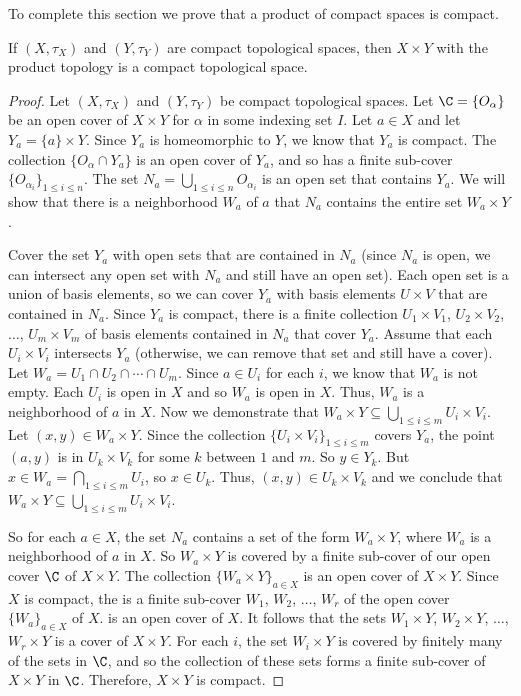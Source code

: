 To complete this section we prove that a product of compact spaces is compact.  

\begin{theorem} If $(X, \tau_X)$ and $(Y, \tau_Y)$ are compact topological spaces, then $X \times Y$ with the product topology is a compact topological space.  
\end{theorem}

\begin{proof} Let $(X, \tau_X)$ and $(Y, \tau_Y)$ be compact topological spaces. Let $\C = \{O_{\alpha}\}$ be an open cover of $X \times Y$ for $\alpha$ in some indexing set $I$. Let $a \in X$ and let $Y_a = \{a\} \times Y$. Since $Y_a$ is homeomorphic to $Y$, we know that $Y_a$ is compact. The collection $\{O_{\alpha} \cap Y_a\}$ is an open cover of $Y_a$, and so has a finite sub-cover $\{O_{\alpha_i}\}_{1 \leq i \leq n}$. The set $N_a = \bigcup_{1 \leq i \leq n} O_{\alpha_i}$ is an open set that contains $Y_a$. We will show that there is a neighborhood $W_a$ of $a$ that $N_a$ contains the entire set $W_a \times Y$. 

Cover the set $Y_a$ with open sets that are contained in $N_a$ (since $N_a$ is open, we can intersect any open set with $N_a$ and still have an open set). Each open set is a union of basis elements, so we can cover $Y_a$ with basis elements $U \times V$ that are contained in $N_a$. Since $Y_a$ is compact, there is a finite collection $U_1 \times V_1$, $U_2 \times V_2$, $\ldots$, $U_m \times V_m$ of basis elements contained in $N_a$ that cover $Y_a$. Assume that each $U_i \times V_i$ intersects $Y_a$ (otherwise, we can remove that set and still have a cover). Let $W_a = U_1 \cap U_2 \cap \cdots \cap U_m$.  Since $a \in U_i$ for each $i$, we know that $W_a$ is not empty. Each $U_i$ is open in $X$ and so $W_a$ is open in $X$. Thus, $W_a$ is a neighborhood of $a$ in $X$. Now we demonstrate that $W_a \times Y \subseteq \bigcup_{1 \leq i \leq m} U_i \times V_i$. Let $(x,y) \in W_a \times Y$. Since the collection $\{U_i \times V_i\}_{1 \leq i \leq m}$ covers $Y_a$, the point $(a,y)$ is in $U_k \times V_k$ for some $k$ between $1$ and $m$. So $y \in Y_k$.  But $x \in W_a = \bigcap_{1 \leq i \leq m} U_i$, so $x \in U_k$. Thus, $(x,y) \in U_k \times V_k$ and we conclude that $W_a \times Y \subseteq \bigcup_{1 \leq i \leq m} U_i \times V_i$.

So for each $a \in X$, the set $N_a$ contains a set of the form $W_a \times Y$, where $W_a$ is a neighborhood of $a$ in $X$. So $W_a \times Y$ is covered by a finite sub-cover of our open cover $\C$ of $X \times Y$. The collection $\{W_a \times Y\}_{a \in X}$ is an open cover of $X \times Y$. Since $X$ is compact, the is a finite sub-cover $W_1$, $W_2$, $\ldots$, $W_r$ of the open cover $\{W_a\}_{a \in X}$ of $X$. is an open cover of $X$. It follows that the sets $W_1 \times Y$, $W_2 \times Y$, $\ldots$, $W_r \times Y$ is a cover of $X \times Y$. For each $i$, the set $W_i \times Y$ is covered by finitely many of the sets in $\C$, and so the collection of these sets forms a finite sub-cover of $X \times Y$ in $\C$. Therefore, $X \times Y$ is compact. 
\end{proof}


